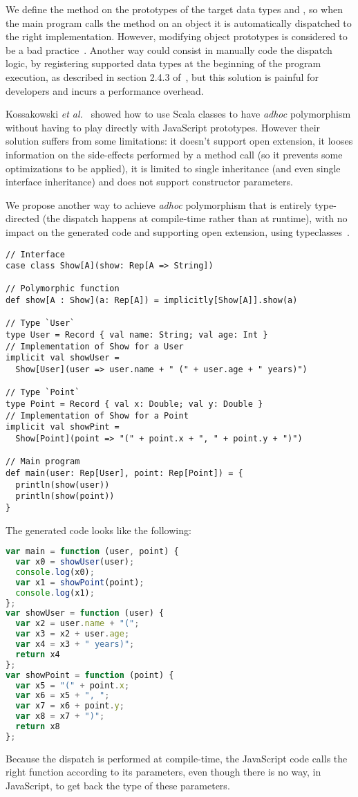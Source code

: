 \documentclass[american,english,runningheads]{llncs}
\newcommand{\etal}{\emph{et al.~}}
\begin{document}
We define the  method on the prototypes of the target data types  and , so when the main program calls the  method on an object it is automatically dispatched to the right implementation. However, modifying object prototypes is considered to be a bad practice~\cite{Zakas12_MaintainableJs}. Another way could consist in manually code the dispatch logic, by registering supported data types at the beginning of the program execution, as described in section 2.4.3 of~\cite{Abelson83_SICP}, but this solution is painful for developers and incurs a performance overhead.

Kossakowski \etal{} showed how to use Scala classes to have \emph{adhoc} polymorphism without having to play directly with JavaScript prototypes. However their solution suffers from some limitations: it doesn’t support open extension, it looses information on the side-effects performed by a method call (so it prevents some optimizations to be applied), it is limited to single inheritance (and even single interface inheritance) and does not support constructor parameters.

We propose another way to achieve \emph{adhoc} polymorphism that is entirely type-directed (the dispatch happens at compile-time rather than at runtime), with no impact on the generated code and supporting open extension, using typeclasses~\cite{Wadler89_AdhocPolymorphism,Odersky06_Typeclasses,Oliveira10_Typeclasses}.

\begin{lstlisting}
// Interface
case class Show[A](show: Rep[A => String])

// Polymorphic function
def show[A : Show](a: Rep[A]) = implicitly[Show[A]].show(a)

// Type `User`
type User = Record { val name: String; val age: Int }
// Implementation of Show for a User
implicit val showUser =
  Show[User](user => user.name + " (" + user.age + " years)")

// Type `Point`
type Point = Record { val x: Double; val y: Double }
// Implementation of Show for a Point
implicit val showPint =
  Show[Point](point => "(" + point.x + ", " + point.y + ")")

// Main program
def main(user: Rep[User], point: Rep[Point]) = {
  println(show(user))
  println(show(point))
}
\end{lstlisting}
The generated code looks like the following:
\begin{lstlisting}[language=JavaScript]
var main = function (user, point) {
  var x0 = showUser(user);
  console.log(x0);
  var x1 = showPoint(point);
  console.log(x1);
};
var showUser = function (user) {
  var x2 = user.name + "(";
  var x3 = x2 + user.age;
  var x4 = x3 + " years)";
  return x4
};
var showPoint = function (point) {
  var x5 = "(" + point.x;
  var x6 = x5 + ", ";
  var x7 = x6 + point.y;
  var x8 = x7 + ")";
  return x8
};
\end{lstlisting}
Because the dispatch is performed at compile-time, the JavaScript code calls the right function according to its parameters, even though there is no way, in JavaScript, to get back the type of these parameters.
\end{document}
